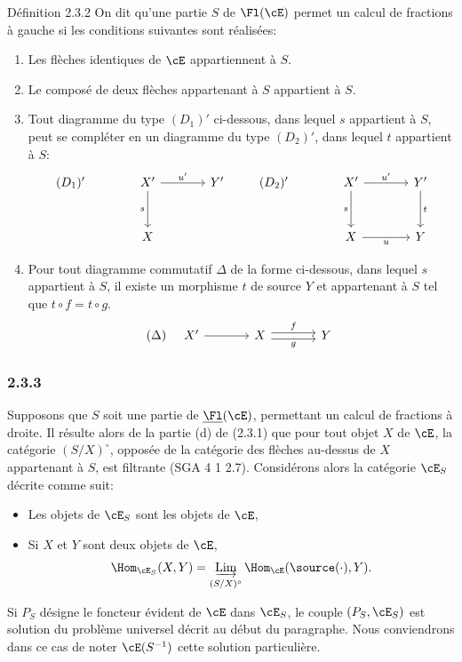 \begin{statement}{Définition 2.3.2}
On dit qu'une partie $S$ de $\Fl(\cE)$ permet un calcul de fractions à gauche si les conditions suivantes sont réalisées:
\begin{enumerate}[label=(\alph*)]
\item[(a')] Les flèches identiques de $\cE$ appartiennent à $S$.
\item[(b')] Le composé de deux flèches appartenant à $S$ appartient à $S$.
\item[(c')] Tout diagramme du type $(D_1)'$ ci-dessous, dans lequel $s$ appartient à $S$,
peut se compléter en un diagramme du type $(D_2)'$, dans lequel $t$ appartient à $S$:
\[
\begin{tikzcd}[column sep=large,row sep=large]
(D_1)'& X' \arrow[r,"u'"] \arrow[d,"s"'] & Y'\\
& X
\end{tikzcd}
\qquad
\begin{tikzcd}[column sep=large,row sep=large]
(D_2)'& X' \arrow[r,"u'"] \arrow[d,"s"'] & Y' \arrow[d,"t"]\\
& X \arrow[r,"u"'] & Y
\end{tikzcd}
\]
\item[(d)'] Pour tout diagramme commutatif $\Delta$ de la forme ci-dessous, dans lequel $s$ appartient à $S$, il existe un morphisme $t$ de source $Y$ et appartenant à $S$ tel que $t\circ f=t\circ g$.
\[
(\Delta)\quad
\begin{tikzcd}[column sep=large]
X' \arrow[r] & X \arrow[r,shift left,"f"] \arrow[r,shift right,"g"'] & Y
\end{tikzcd}
\]
\end{enumerate}
\end{statement}

\subsubsection*{2.3.3}
Supposons que $S$ soit une partie de $\underline{\Fl}(\cE)$, permettant un calcul de fractions à droite. Il résulte alors de la partie (d) de (2.3.1) que pour tout objet $X$ de $\cE$, la catégorie $(S/X)^\circ$, opposée de la catégorie des flèches au-dessus de $X$ appartenant à $S$, est filtrante (SGA 4 1 2.7). Considérons alors la catégorie $\cE_S$ décrite comme suit:
\begin{itemize}[label=-]
\item Les objets de $\cE_S$ sont les objets de $\cE$,
\item Si $X$ et $Y$ sont deux objets de $\cE$,
\[
\Hom_{\cE_S}(X,Y)=\mathop{\underrightarrow{\mathrm{Lim}}}\limits_{(S/X)^\circ}\Hom_{\cE}(\source(\cdot),Y).
\]
\end{itemize}
Si $P_S$ désigne le foncteur évident de $\cE$ dans $\cE_S$, le couple $(P_S,\cE_S)$ est solution du problème universel décrit au début du paragraphe. Nous conviendrons dans ce cas de noter $\cE(S^{-1})$ cette solution particulière.

